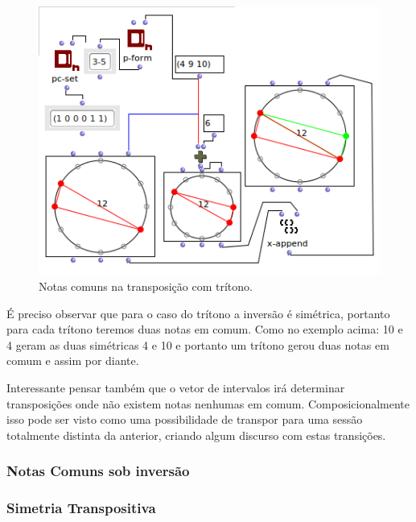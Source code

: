 \documentclass[
	12pt,				%
	openright,			%
	twoside,			%
	a4paper,			%
	english,			%
	french,				%
	spanish,			%
	brazil				%
	]{abntex2}
\begin{document}
\begin{figure}[!h]
	\caption{\label{fig_grafico}Notas comuns na transposição com trítono. }
	\begin{center}
	    \includegraphics[scale=0.7]{OM_settheory/notas_comuns_tritono.png}
	\end{center}
\end{figure}

É preciso observar que para o caso do trítono a inversão é simétrica, portanto para cada trítono teremos duas notas em comum. Como no exemplo acima: 10 e 4 geram as duas simétricas 4 e 10 e portanto um trítono gerou duas notas em comum e assim por diante.

Interessante pensar também que o vetor de intervalos irá determinar transposições onde não existem notas nenhumas em comum. Composicionalmente isso pode ser visto como uma possibilidade de transpor para uma sessão totalmente distinta da anterior, criando algum discurso com estas transições.



\subsubsection{Notas Comuns sob inversão}

\lipsum[13]

\subsubsection{Simetria Transpositiva}

\lipsum[14]
\end{document}
